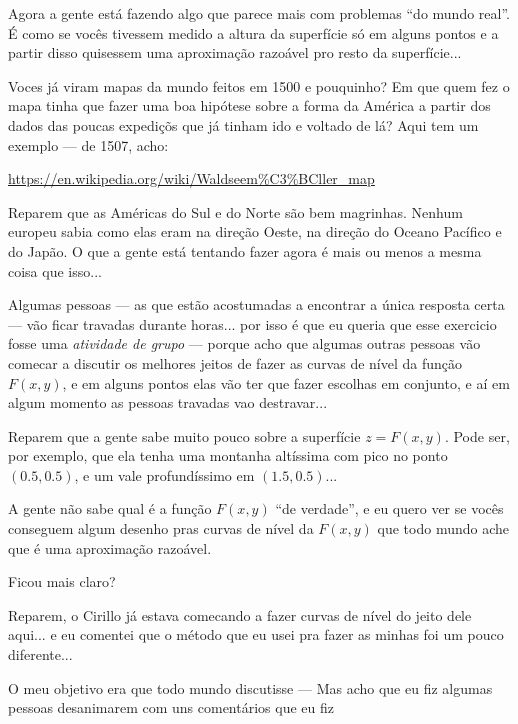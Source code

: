 \documentclass[oneside,12pt]{article}
\begin{document}
Agora a gente está fazendo algo que parece mais com problemas ``do
mundo real''. É como se vocês tivessem medido a altura da superfície
só em alguns pontos e a partir disso quisessem uma aproximação
razoável pro resto da superfície...

Voces já viram mapas da mundo feitos em 1500 e pouquinho? Em que quem
fez o mapa tinha que fazer uma boa hipótese sobre a forma da América a
partir dos dados das poucas expediçõs que já tinham ido e voltado de
lá? Aqui tem um exemplo --- de 1507, acho:

\ssk

\url{https://en.wikipedia.org/wiki/Waldseem\%C3\%BCller_map}

\ssk

Reparem que as Américas do Sul e do Norte são bem magrinhas. Nenhum
europeu sabia como elas eram na direção Oeste, na direção do Oceano
Pacífico e do Japão. O que a gente está tentando fazer agora é mais ou
menos a mesma coisa que isso...

Algumas pessoas --- as que estão acostumadas a encontrar a única
resposta certa --- vão ficar travadas durante horas... por isso é que
eu queria que esse exercicio fosse uma {\sl atividade de grupo} ---
porque acho que algumas outras pessoas vão comecar a discutir os
melhores jeitos de fazer as curvas de nível da função $F(x,y)$, e em
alguns pontos elas vão ter que fazer escolhas em conjunto, e aí em
algum momento as pessoas travadas vao destravar...

Reparem que a gente sabe muito pouco sobre a superfície $z = F(x,y)$.
Pode ser, por exemplo, que ela tenha uma montanha altíssima com pico
no ponto $(0.5,0.5)$, e um vale profundíssimo em $(1.5,0.5)$...

A gente não sabe qual é a função $F(x,y)$ ``de verdade'', e eu quero
ver se vocês conseguem algum desenho pras curvas de nível da $F(x,y)$
que todo mundo ache que é uma aproximação razoável.

Ficou mais claro?


\newpage

Reparem, o Cirillo já estava comecando a fazer curvas de nível do
jeito dele aqui... e eu comentei que o método que eu usei pra fazer as
minhas foi um pouco diferente...

O meu objetivo era que todo mundo discutisse --- Mas acho que eu fiz
algumas pessoas desanimarem com uns comentários que eu fiz
\end{document}
